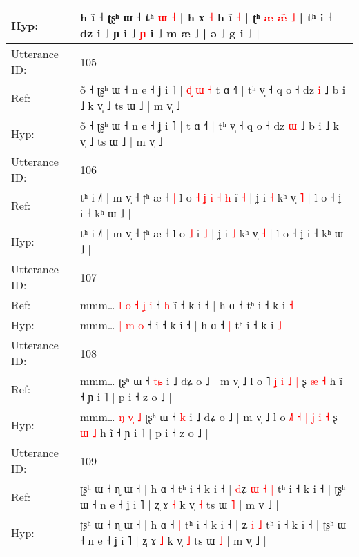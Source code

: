 \documentclass[10pt]{article}
\DeclareRobustCommand{\hl}[1]{{\textcolor{red}{#1}}}
\begin{document}
\begin{longtable}{ll}
Hyp: & h ĩ ˧ ʈʂʰ ɯ ˧\hl{}\hl{} tʰ \hl{ɯ} \hl{}\hl{˧} | h ɤ \hl{˧} h ĩ\hl{}\hl{}\hl{}\hl{}\hl{}\hl{} \hl{˧} | ʈ\hl{}ʰ\hl{}\hl{} \hl{æ} \hl{}\hl{æ}\hl{̃} \hl{˩} | tʰ i ˧ dz i ˩ ɲ i ˩ \hl{ɲ} i ˩ m æ ˩ | ə ˩ g i ˩ |
 \\
\midrule
Utterance ID: & 105 \\
Ref: & õ ˧ ʈʂʰ ɯ ˧ n e ˧ ʝ i ˥ |\hl{ }\hl{ɖ}\hl{ }\hl{ɯ}\hl{ }\hl{˧} t ɑ ˧˥ | tʰ v̩ ˧ q o ˧ dz \hl{i} ˩ b i ˩ k v̩ ˩ ts ɯ ˩ | m v̩ ˩
 \\
Hyp: & õ ˧ ʈʂʰ ɯ ˧ n e ˧ ʝ i ˥ |\hl{}\hl{}\hl{}\hl{}\hl{}\hl{} t ɑ ˧˥ | tʰ v̩ ˧ q o ˧ dz \hl{ɯ} ˩ b i ˩ k v̩ ˩ ts ɯ ˩ | m v̩ ˩
 \\
\midrule
Utterance ID: & 106 \\
Ref: & tʰ i ˩˥ | m v̩ ˧ ʈʰ æ ˧\hl{ }\hl{|} l o\hl{ }\hl{˧}\hl{ }\hl{ʝ}\hl{ }\hl{i}\hl{ }\hl{˧} \hl{h} i\hl{̃} \hl{˧} | ʝ i \hl{˧} kʰ v̩ \hl{˥} | l o ˧ ʝ i ˧ kʰ ɯ ˩ |
 \\
Hyp: & tʰ i ˩˥ | m v̩ ˧ ʈʰ æ ˧\hl{}\hl{} l o\hl{}\hl{}\hl{}\hl{}\hl{}\hl{}\hl{}\hl{} \hl{˩} i\hl{} \hl{˩} | ʝ i \hl{˩} kʰ v̩ \hl{˧} | l o ˧ ʝ i ˧ kʰ ɯ ˩ |
 \\
\midrule
Utterance ID: & 107 \\
Ref: & mmm…\hl{ }\hl{l}\hl{ }\hl{o} \hl{˧} \hl{ʝ} \hl{i} ˧\hl{ }\hl{h} i\hl{̃} ˧ k i ˧ | h ɑ ˧\hl{}\hl{} tʰ i ˧ k i\hl{}\hl{} \hl{˧}
 \\
Hyp: & mmm…\hl{}\hl{}\hl{}\hl{} \hl{|} \hl{m} \hl{o} ˧\hl{}\hl{} i\hl{} ˧ k i ˧ | h ɑ ˧\hl{ }\hl{|} tʰ i ˧ k i\hl{ }\hl{˩} \hl{|}
 \\
\midrule
Utterance ID: & 108 \\
Ref: & mmm…\hl{}\hl{}\hl{}\hl{}\hl{}\hl{}\hl{} ʈʂʰ ɯ ˧ \hl{t}\hl{ɕ} i ˩ dʑ o ˩ | m v̩ ˩ l o \hl{}˥\hl{}\hl{} \hl{ʝ} \hl{i} \hl{˩} \hl{|} ʂ \hl{æ} \hl{˧} h ĩ ˧ ɲ i ˥ | p i ˧ z o ˩ |
 \\
Hyp: & mmm…\hl{ }\hl{ŋ}\hl{ }\hl{v}\hl{̩}\hl{ }\hl{˩} ʈʂʰ ɯ ˧ \hl{}\hl{k} i ˩ dʑ o ˩ | m v̩ ˩ l o \hl{˩}˥\hl{ }\hl{˧} \hl{|} \hl{ʝ} \hl{i} \hl{˧} ʂ \hl{ɯ} \hl{˩} h ĩ ˧ ɲ i ˥ | p i ˧ z o ˩ |
 \\
\midrule
Utterance ID: & 109 \\
Ref: & ʈʂʰ ɯ ˧ ɳ ɯ ˧ | h ɑ ˧\hl{}\hl{} tʰ i ˧ k i ˧ | \hl{d}ʑ\hl{ }\hl{ɯ} \hl{˧} \hl{|} tʰ i ˧ k i ˧ | ʈʂʰ ɯ ˧ n e ˧ ʝ i ˥ | ʐ ɤ \hl{˧} k v̩ \hl{˧} ts ɯ \hl{˥} | m v̩ ˩ |
 \\
Hyp: & ʈʂʰ ɯ ˧ ɳ ɯ ˧ | h ɑ ˧\hl{ }\hl{|} tʰ i ˧ k i ˧ | \hl{}ʑ\hl{}\hl{} \hl{i} \hl{˩} tʰ i ˧ k i ˧ | ʈʂʰ ɯ ˧ n e ˧ ʝ i ˥ | ʐ ɤ \hl{˩} k v̩ \hl{˩} ts ɯ \hl{˩} | m v̩ ˩ |
 \\

\end{longtable}
\end{document}
